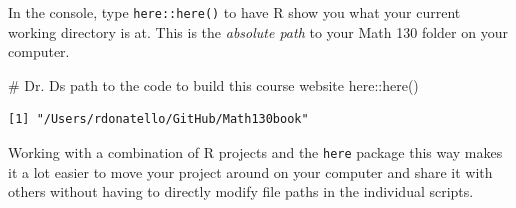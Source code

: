 \documentclass[
  letterpaper,
  DIV=11,
  numbers=noendperiod,
  oneside]{scrreprt}
\newenvironment{Shaded}{\begin{snugshade}}{\end{snugshade}}
\newcommand{\CommentTok}[1]{\textcolor[rgb]{0.37,0.37,0.37}{#1}}
\newcommand{\FunctionTok}[1]{\textcolor[rgb]{0.28,0.35,0.67}{#1}}
\newcommand{\NormalTok}[1]{\textcolor[rgb]{0.00,0.23,0.31}{#1}}
\newcommand{\SpecialCharTok}[1]{\textcolor[rgb]{0.37,0.37,0.37}{#1}}
\begin{document}
{}

\begin{tcolorbox}[enhanced jigsaw, bottomrule=.15mm, colback=white, colframe=quarto-callout-tip-color-frame, toprule=.15mm, coltitle=black, rightrule=.15mm, opacitybacktitle=0.6, colbacktitle=quarto-callout-tip-color!10!white, toptitle=1mm, leftrule=.75mm, breakable, bottomtitle=1mm, titlerule=0mm, title={👉 Whats your path?}, arc=.35mm, left=2mm, opacityback=0]

In the console, type \texttt{here::here()} to have R show you what your
current working directory is at. This is the \emph{absolute path} to
your Math 130 folder on your computer.

\begin{Shaded}
\begin{Highlighting}[]
\CommentTok{\# Dr. D\textquotesingle{}s path to the code to build this course website}
\NormalTok{here}\SpecialCharTok{::}\FunctionTok{here}\NormalTok{()}
\end{Highlighting}
\end{Shaded}

\begin{verbatim}
[1] "/Users/rdonatello/GitHub/Math130book"
\end{verbatim}

\end{tcolorbox}

Working with a combination of R projects and the \texttt{here} package
this way makes it a lot easier to move your project around on your
computer and share it with others without having to directly modify file
paths in the individual scripts.
\end{document}

